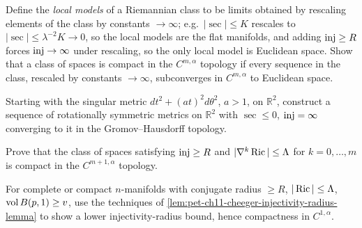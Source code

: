 \begin{remark}
  \label{rem:pet-ch11-exercise-11-6-10}
  Define the \emph{local models} of a Riemannian class to be limits
  obtained by rescaling elements of the class by constants $\to\infty$; e.g.\
  $|\sec|\le K$ rescales to $|\sec|\le\lambda^{-2}K\to0$, so the local models
  are the flat manifolds, and adding $\operatorname{inj}\ge R$ forces $\operatorname{inj}\to\infty$ under
  rescaling, so the only local model is Euclidean space. Show that a class of
  spaces is compact in the $C^{m,\alpha}$ topology if every sequence in the
  class, rescaled by constants $\to\infty$, subconverges in $C^{m,\alpha}$ to
  Euclidean space.
\end{remark}

\begin{remark}
  \label{rem:pet-ch11-exercise-11-6-11}
  Starting with the singular metric $dt^2+(at)^2d\theta^2$, $a>1$, on
  $\mathbb{R}^2$, construct a sequence of rotationally symmetric metrics on
  $\mathbb{R}^2$ with
  $\sec\le0$, $\operatorname{inj}=\infty$ converging to it in the Gromov--Hausdorff
  topology.
\end{remark}

\begin{remark}
  \label{rem:pet-ch11-exercise-11-6-12}
  Prove that the class of spaces satisfying $\operatorname{inj}\ge R$ and
  $|\nabla^k\operatorname{Ric}|\le\Lambda$ for $k=0,\dots,m$ is compact in the
  $C^{m+1,\alpha}$ topology.
\end{remark}

\begin{remark}
  \label{rem:pet-ch11-exercise-11-6-13}
  For complete or compact $n$-manifolds with
  conjugate radius $\ge R$, $|\operatorname{Ric}|\le\Lambda$, $\operatorname{vol} B(p,1)\ge v$, use the
  techniques of \cref{lem:pet-ch11-cheeger-injectivity-radius-lemma} to show
  a lower injectivity-radius bound, hence compactness in $C^{1,\alpha}$.
\end{remark}

